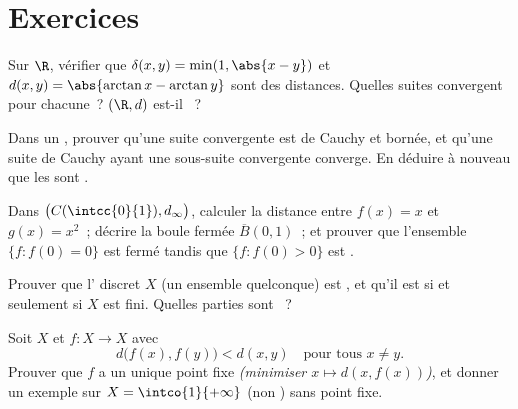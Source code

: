 \section{Exercices}

\begin{exercise}[$\star$]\label{exo:b2:metric:1}
Sur $\R$, vérifier que $\delta(x, y) = \min(1, \abs{x - y})$ et
$d(x,y) = \abs{\arctan x - \arctan y}$ sont des distances. Quelles
suites convergent pour chacune~? $(\R, d)$ est-il ~?
\end{exercise}

\begin{exercise}[$\star$]\label{exo:b2:metric:2}
Dans un , prouver qu'une suite convergente est de
Cauchy et bornée, et qu'une suite de Cauchy ayant une sous-suite
convergente converge. En déduire à nouveau que les  sont .
\end{exercise}

\begin{exercise}[$\star$]\label{exo:b2:metric:3}
Dans $\bigl(C(\intcc{0}{1}), d_\infty\bigr)$, calculer la distance
entre $f(x) = x$ et $g(x) = x^2$~; décrire la boule fermée
$\overline B(0, 1)$~; et prouver que l'ensemble $\{f : f(0) = 0\}$
est fermé tandis que $\{f : f(0) > 0\}$ est .
\end{exercise}

\begin{exercise}[$\star\star$]\label{exo:b2:metric:4}
Prouver que l' discret $X$ (un ensemble quelconque)
est , et qu'il est  si et seulement si $X$ est fini.
Quelles parties sont ~?
\end{exercise}

\begin{exercise}[$\star\star$]\label{exo:b2:metric:5}
Soit $X$  et $f \colon X \to X$ avec
\[
d\bigl(f(x), f(y)\bigr) < d(x, y) \quad \text{pour tous } x \neq y .
\]
Prouver que $f$ a un unique point fixe \emph{(minimiser $x \mapsto
d(x, f(x))$)}, et donner un exemple sur $X = \intco{1}{+\infty}$
(non ) sans point fixe.
\end{exercise}

